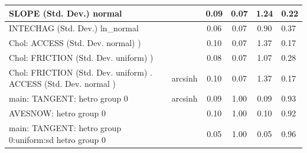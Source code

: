 \begin{table}
\begin{center}
\begin{tabular}{|l|l|c|c|c|l|}
			\hline
			SLOPE (Std. Dev.) normal &  & 0.09 & 0.07 & 1.24 & 0.22 \\
			\hline
			INTECHAG (Std. Dev.) ln_normal &  & 0.06 & 0.07 & 0.90 & 0.37 \\
			\hline
			 Chol: ACCESS (Std. Dev. normal) ) &  & 0.10 & 0.07 & 1.37 & 0.17 \\
			\hline
			 Chol: FRICTION (Std. Dev. uniform) ) &  & 0.08 & 0.07 & 1.07 & 0.28 \\
			\hline
			 Chol: FRICTION (Std. Dev. uniform) . ACCESS (Std. Dev.   normal ) & arcsinh & 0.10 & 0.07 & 1.37 & 0.17 \\
			\hline
			main: TANGENT: hetro group 0 & arcsinh & 0.09 & 1.00 & 0.09 & 0.93 \\
			\hline
			AVESNOW: hetro group 0 &  & 0.10 & 1.00 & 0.10 & 0.92 \\
			\hline
			main: TANGENT: hetro group 0:uniform:sd  hetro group 0 &  & 0.05 & 1.00 & 0.05 & 0.96 \\
			\hline
		\end{tabular}
	\end{center}
\end{table}